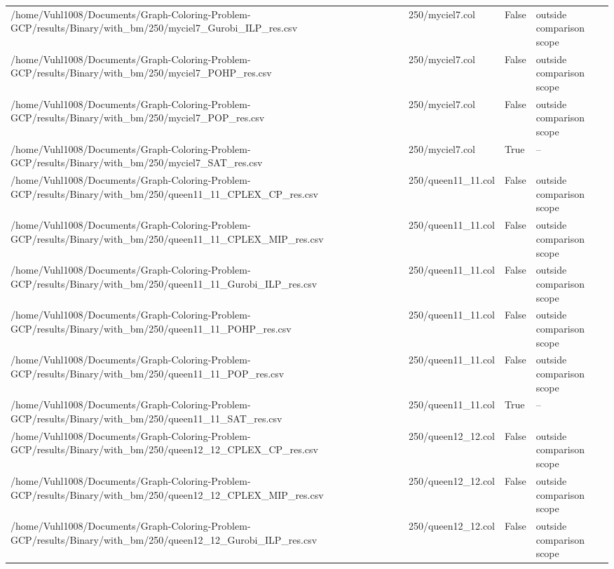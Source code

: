 \begin{table}[htbp]
\begin{tabular}{llll}
/home/Vuhl1008/Documents/Graph-Coloring-Problem-GCP/results/Binary/with\_bm/250/myciel7\_Gurobi\_ILP\_res.csv & 250/myciel7.col & False & outside comparison scope \\
/home/Vuhl1008/Documents/Graph-Coloring-Problem-GCP/results/Binary/with\_bm/250/myciel7\_POHP\_res.csv & 250/myciel7.col & False & outside comparison scope \\
/home/Vuhl1008/Documents/Graph-Coloring-Problem-GCP/results/Binary/with\_bm/250/myciel7\_POP\_res.csv & 250/myciel7.col & False & outside comparison scope \\
/home/Vuhl1008/Documents/Graph-Coloring-Problem-GCP/results/Binary/with\_bm/250/myciel7\_SAT\_res.csv & 250/myciel7.col & True & -- \\
/home/Vuhl1008/Documents/Graph-Coloring-Problem-GCP/results/Binary/with\_bm/250/queen11\_11\_CPLEX\_CP\_res.csv & 250/queen11\_11.col & False & outside comparison scope \\
/home/Vuhl1008/Documents/Graph-Coloring-Problem-GCP/results/Binary/with\_bm/250/queen11\_11\_CPLEX\_MIP\_res.csv & 250/queen11\_11.col & False & outside comparison scope \\
/home/Vuhl1008/Documents/Graph-Coloring-Problem-GCP/results/Binary/with\_bm/250/queen11\_11\_Gurobi\_ILP\_res.csv & 250/queen11\_11.col & False & outside comparison scope \\
/home/Vuhl1008/Documents/Graph-Coloring-Problem-GCP/results/Binary/with\_bm/250/queen11\_11\_POHP\_res.csv & 250/queen11\_11.col & False & outside comparison scope \\
/home/Vuhl1008/Documents/Graph-Coloring-Problem-GCP/results/Binary/with\_bm/250/queen11\_11\_POP\_res.csv & 250/queen11\_11.col & False & outside comparison scope \\
/home/Vuhl1008/Documents/Graph-Coloring-Problem-GCP/results/Binary/with\_bm/250/queen11\_11\_SAT\_res.csv & 250/queen11\_11.col & True & -- \\
/home/Vuhl1008/Documents/Graph-Coloring-Problem-GCP/results/Binary/with\_bm/250/queen12\_12\_CPLEX\_CP\_res.csv & 250/queen12\_12.col & False & outside comparison scope \\
/home/Vuhl1008/Documents/Graph-Coloring-Problem-GCP/results/Binary/with\_bm/250/queen12\_12\_CPLEX\_MIP\_res.csv & 250/queen12\_12.col & False & outside comparison scope \\
/home/Vuhl1008/Documents/Graph-Coloring-Problem-GCP/results/Binary/with\_bm/250/queen12\_12\_Gurobi\_ILP\_res.csv & 250/queen12\_12.col & False & outside comparison scope \\

\end{tabular}
\end{table}
